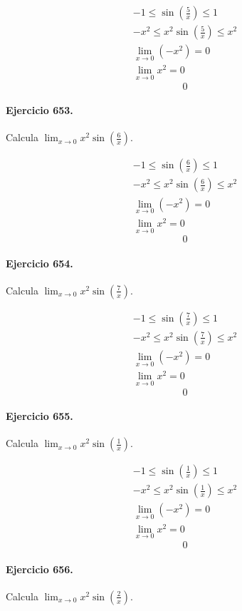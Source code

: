 \documentclass[11pt,a4paper]{article}
\begin{document}
\[
\begin{aligned}
-1\le\sin\left(\frac{5}{x}\right)\le1\\
-x^2\le x^2\sin\left(\frac{5}{x}\right)\le x^2\\
\lim_{x\to0}(-x^2)=0\\
\lim_{x\to0}x^2=0
\end{aligned}
\]
\[\boxed{0}\]


\paragraph{Ejercicio 653.} Calcula $\displaystyle\lim_{x\to0}x^2\sin\left(\frac{6}{x}\right)$.

\[
\begin{aligned}
-1\le\sin\left(\frac{6}{x}\right)\le1\\
-x^2\le x^2\sin\left(\frac{6}{x}\right)\le x^2\\
\lim_{x\to0}(-x^2)=0\\
\lim_{x\to0}x^2=0
\end{aligned}
\]
\[\boxed{0}\]


\paragraph{Ejercicio 654.} Calcula $\displaystyle\lim_{x\to0}x^2\sin\left(\frac{7}{x}\right)$.

\[
\begin{aligned}
-1\le\sin\left(\frac{7}{x}\right)\le1\\
-x^2\le x^2\sin\left(\frac{7}{x}\right)\le x^2\\
\lim_{x\to0}(-x^2)=0\\
\lim_{x\to0}x^2=0
\end{aligned}
\]
\[\boxed{0}\]


\paragraph{Ejercicio 655.} Calcula $\displaystyle\lim_{x\to0}x^2\sin\left(\frac{1}{x}\right)$.

\[
\begin{aligned}
-1\le\sin\left(\frac{1}{x}\right)\le1\\
-x^2\le x^2\sin\left(\frac{1}{x}\right)\le x^2\\
\lim_{x\to0}(-x^2)=0\\
\lim_{x\to0}x^2=0
\end{aligned}
\]
\[\boxed{0}\]


\paragraph{Ejercicio 656.} Calcula $\displaystyle\lim_{x\to0}x^2\sin\left(\frac{2}{x}\right)$.
\end{document}

